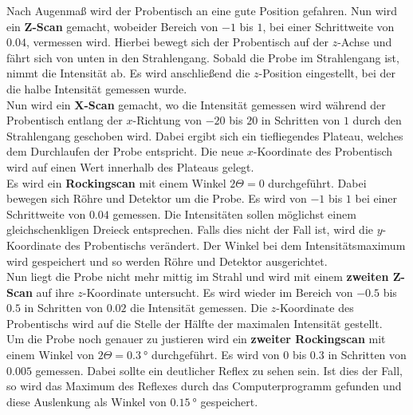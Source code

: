         \noindent Nach Augenmaß wird der Probentisch an eine gute Position gefahren. Nun wird ein \textbf{Z-Scan} gemacht, wobeider Bereich von 
        $\num{-1}$ bis $\num{1}$, bei einer Schrittweite von $\num{0.04}$, vermessen wird. Hierbei bewegt sich der Probentisch auf der $z$-Achse und fährt 
        sich von unten in den Strahlengang. Sobald die Probe im Strahlengang ist, nimmt die Intensität ab. Es wird anschließend die $z$-Position 
        eingestellt, bei der die halbe Intensität gemessen wurde. \\ 

        \noindent Nun wird ein \textbf{X-Scan} gemacht, wo die Intensität gemessen wird während der Probentisch entlang der $x$-Richtung von 
        $\num{-20}$ bis $\num{20}$ in Schritten von $\num{1}$ durch den Strahlengang geschoben wird. Dabei ergibt sich ein tiefliegendes Plateau, 
        welches dem Durchlaufen der Probe entspricht. Die neue $x$-Koordinate des Probentisch wird auf einen Wert innerhalb des Plateaus gelegt. \\

        \noindent Es wird ein \textbf{Rockingscan} mit einem Winkel $2 \Theta = \num{0}$ durchgeführt. Dabei bewegen sich Röhre und Detektor um die Probe. 
        Es wird von $\num{-1}$ bis $\num{1}$ bei einer Schrittweite von $\num{0.04}$ gemessen. Die Intensitäten sollen
        möglichst einem gleichschenkligen Dreieck entsprechen. Falls dies nicht der Fall ist, wird die $y$-Koordinate des Probentischs verändert. 
        Der Winkel bei dem Intensitätsmaximum wird gespeichert und so werden Röhre und Detektor ausgerichtet. \\

        \noindent Nun liegt die Probe nicht mehr mittig im Strahl und wird mit einem \textbf{zweiten Z-Scan} auf ihre $z$-Koordinate untersucht. 
        Es wird wieder im Bereich von $\num{-0.5}$ bis $\num{0.5}$ in Schritten von $\num{0.02}$ die Intensität gemessen. Die $z$-Koordinate des 
        Probentischs wird auf die Stelle der Hälfte der maximalen Intensität gestellt. \\

        \noindent Um die Probe noch genauer zu justieren wird ein \textbf{zweiter Rockingscan} mit einem Winkel von $2\Theta = \SI{0.3}{\degree}$ 
        durchgeführt. Es wird von $\num{0}$ bis $\num{0.3}$ in Schritten von $\num{0.005}$ gemessen.
        Dabei sollte ein deutlicher Reflex zu sehen sein. 
        Ist dies der Fall, so wird das Maximum des Reflexes durch das Computerprogramm gefunden und diese Auslenkung als Winkel von 
        $\SI{0.15}{\degree}$ gespeichert. \\

